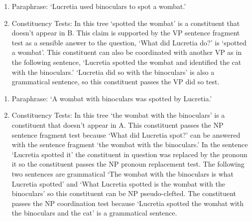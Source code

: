 \documentclass{article}
\begin{document}
\begin{enumerate}[label=(\alph*)]
    \item Paraphrase: `Lucretia used binoculars to spot a wombat.'
    \item Constituency Tests: In this tree `spotted the wombat' is a
      constituent that doesn't appear in B. This claim is supported by the VP
      sentence fragment test as a
      sensible answer to the question, `What did Lucretia do?' is `spotted a
      wombat'. This constituent can also be coordinated with another VP as in
      the following sentence, `Lucretia spotted the wombat and identified the
      cat with the binoculars.' `Lucretia did so with the binoculars' is also a
      grammatical sentence, so this constituent passes the VP did so test.
\end{enumerate}


\begin{enumerate}[label=(\alph*)]
    \item Paraphrase: `A wombat with binoculars was spotted by Lucretia.'
    \item Constituency Tests: In this tree `the wombat with the binoculars' is a
      constituent that doesn't appear in A. This constituent passes the NP
      sentence fragment test because `What did Lucretia spot?' can be answered
      with the sentence fragment `the wombat with the binoculars.' In the
      sentence `Lucretia spotted it'
      the constituent in question was replaced by the pronoun it so the
      constituent passes the NP pronoun replacement test. The following two
      sentences are grammatical `The wombat with the binoculars is what Lucretia
      spotted' and `What Lucretia spotted is the wombat with the binoculars' so
      this constituent can be NP pseudo-clefted. The constituent passes the NP
      coordination test because `Lucretia spotted the wombat with the binoculars
      and the cat' is a grammatical sentence.
\end{enumerate}
\end{document}
